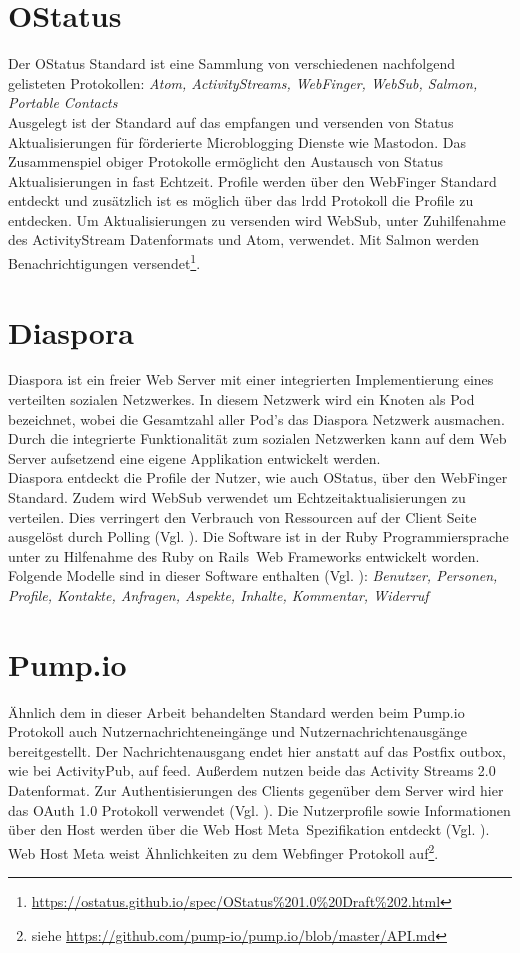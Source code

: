 \section{OStatus}
\label{sub:ostatus}
	Der OStatus Standard ist eine Sammlung von verschiedenen nachfolgend gelisteten Protokollen: \textit{Atom, ActivityStreams, WebFinger, WebSub, Salmon, Portable Contacts}\\
	
	Ausgelegt ist der Standard auf das empfangen und versenden von Status Aktualisierungen für förderierte Microblogging Dienste wie Mastodon. Das Zusammenspiel obiger Protokolle ermöglicht den Austausch von Status Aktualisierungen in fast Echtzeit. Profile werden über den WebFinger Standard entdeckt und zusätzlich ist es möglich über das \gls{lrdd} Protokoll die Profile zu entdecken. Um Aktualisierungen zu versenden wird WebSub, unter Zuhilfenahme des ActivityStream Datenformats und Atom, verwendet. Mit Salmon werden Benachrichtigungen versendet\footnote{\url{https://ostatus.github.io/spec/OStatus\%201.0\%20Draft\%202.html}}.
\section{Diaspora}
\label{sub:diaspora}
	Diaspora ist ein freier Web Server mit einer integrierten Implementierung eines verteilten sozialen Netzwerkes. In diesem Netzwerk wird ein Knoten als Pod bezeichnet, wobei die Gesamtzahl aller Pod's das Diaspora Netzwerk ausmachen. Durch die integrierte Funktionalität zum sozialen Netzwerken kann auf dem Web Server aufsetzend eine eigene Applikation entwickelt werden.\\ 
	
	Diaspora entdeckt die Profile der Nutzer, wie auch OStatus, über den WebFinger Standard. Zudem wird WebSub verwendet um Echtzeitaktualisierungen zu verteilen. Dies verringert den Verbrauch von Ressourcen auf der Client Seite ausgelöst durch Polling (Vgl. \cite{diaspora-about}). Die Software ist in der Ruby Programmiersprache unter zu Hilfenahme des \glqq Ruby on Rails\grqq~Web Frameworks entwickelt worden. Folgende Modelle sind in dieser Software enthalten (Vgl. \cite{diaspora-introduction}):
	\textit{Benutzer, Personen, Profile, Kontakte, Anfragen, Aspekte, Inhalte, Kommentar, Widerruf}
\section{Pump.io}
\label{sub:pumpio}
	Ähnlich dem in dieser Arbeit behandelten Standard werden beim Pump.io Protokoll auch Nutzernachrichteneingänge und Nutzernachrichtenausgänge bereitgestellt. Der Nachrichtenausgang endet hier anstatt auf das Postfix \glqq outbox\grqq, wie bei ActivityPub, auf \glqq feed\grqq. Außerdem nutzen beide das Activity Streams 2.0 Datenformat. Zur Authentisierungen des Clients gegenüber dem Server wird hier das OAuth 1.0 Protokoll verwendet (Vgl. \cite{oauth-1.0-protocol}). Die Nutzerprofile sowie Informationen über den Host werden über die \glqq Web Host Meta\grqq~Spezifikation entdeckt (Vgl. \cite{web-host-meta}). Web Host Meta weist Ähnlichkeiten zu dem Webfinger Protokoll auf\footnote{siehe \url{https://github.com/pump-io/pump.io/blob/master/API.md}}.
